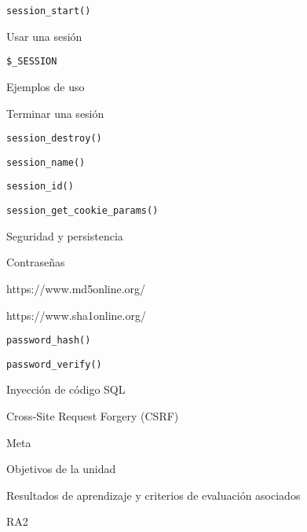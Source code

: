 \begin{longenum}
\begin{longenum}
\begin{longenum}
            \begin{longenum}
                \item \texttt{session\_start()}
            \end{longenum}
            \item Usar una sesión
            \begin{longenum}
                \item \texttt{\$\_SESSION}
                \item Ejemplos de uso
            \end{longenum}
            \item Terminar una sesión
            \begin{longenum}
                \item \texttt{session\_destroy()}
                \item \texttt{session\_name()}
                \item \texttt{session\_id()}
                \item \texttt{session\_get\_cookie\_params()}
            \end{longenum}
        \end{longenum}
        \item Seguridad y persistencia
        \begin{longenum}
            \item Contraseñas
            \begin{longenum}
                \item https://www.md5online.org/
                \item https://www.sha1online.org/
                \item \texttt{password\_hash()}
                \item \texttt{password\_verify()}
            \end{longenum}
            \item Inyección de código SQL
            \item Cross-Site Request Forgery (CSRF)
        \end{longenum}
        \item Meta
        \begin{longenum}
            \item Objetivos de la unidad
            \item Resultados de aprendizaje y criterios de evaluación asociados
            \begin{longenum}
                \item RA2

\end{longenum}
\end{longenum}
\end{longenum}
\end{longenum}
